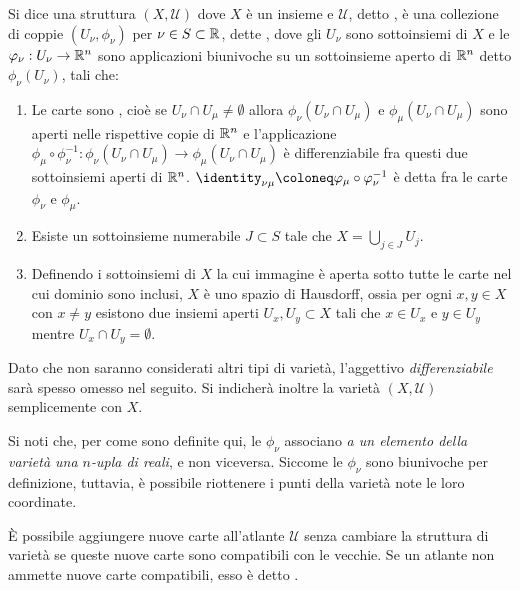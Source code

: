 \begin{definition}
  Si dice  una struttura $(X,\mathcal{U})$ dove $X$ è un insieme e $\mathcal{U}$, detto , è una collezione di coppie $(U_{\nu}, \phi_{\nu})$ per $\nu \in S \subset \mathbb{R}$, dette , dove gli $U_{\nu}$ sono sottoinsiemi di $X$ e le $\varphi_{\nu}:U_{\nu}\to \mathbb{R}^{n}$ sono applicazioni biunivoche su un sottoinsieme aperto di $\mathbb{R}^{n}$ detto $\phi_{\nu}(U_{\nu})$, tali che:
  \begin{enumerate}
    \item Le carte sono , cioè se $U_{\nu} \cap U_{\mu} \neq \emptyset$ allora $\phi_{\nu}(U_{\nu} \cap U_{\mu})$ e $\phi_{\mu}(U_{\nu} \cap U_{\mu})$ sono aperti nelle rispettive copie di $\mathbb{R}^{n}$ e l'applicazione $\phi_{\mu} \circ \phi_{\nu}^{-1}: \phi_{\nu}(U_{\nu} \cap U_{\mu}) \to \phi_{\mu}(U_{\nu} \cap U_{\mu})$ è differenziabile fra questi due sottoinsiemi aperti di $\mathbb{R}^{n}$. $\identity_{\nu\mu} \defeq \phi_{\mu} \circ \phi_{\nu}^{-1}$ è detta  fra le carte $\phi_{\nu}$ e $\phi_{\mu}$.
    \item Esiste un sottoinsieme numerabile $J \subset S$ tale che $X = \bigcup_{j \in  J} U_j$.
    \item Definendo  i sottoinsiemi di $X$ la cui immagine è aperta sotto tutte le carte nel cui dominio sono inclusi, $X$ è uno spazio di Hausdorff, ossia per ogni $x,y \in X$ con $x \neq y$ esistono due insiemi aperti $U_x, U_y \subset X$ tali che $x \in U_x$ e $y \in  U_y$ mentre $U_x \cap U_y = \emptyset$.
  \end{enumerate}
   Dato che non saranno considerati altri tipi di varietà, l'aggettivo \emph{differenziabile} sarà spesso omesso nel seguito. Si indicherà inoltre la varietà $(X,\mathcal{U})$ semplicemente con $X$.
\end{definition}
\begin{remark}
  Si noti che, per come sono definite qui, le $\phi_{\nu}$ associano \emph{a un elemento della varietà una $n$-upla di reali}, e non viceversa. Siccome le $\phi_{\nu}$ sono biunivoche per definizione, tuttavia, è possibile riottenere i punti della varietà note le loro coordinate.
\end{remark}
\begin{remark}
  È possibile aggiungere nuove carte all'atlante $\mathcal{U}$ senza cambiare la struttura di varietà se queste nuove carte sono compatibili con le vecchie. Se un atlante non ammette nuove carte compatibili, esso è detto .
\end{remark}
